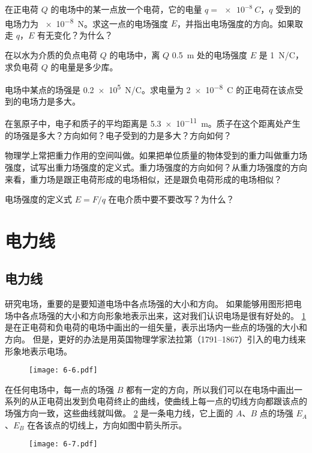 \begin{Practice}
\begin{question}
	\item 在正电荷 $Q$ 的电场中的某一点放一个电荷，它的电量 $q=\qty{e-8}{C}$，$q$ 受到的电场力为 \qty{e-8}{N}。求这一点的电场强度 $E$，并指出电场强度的方向。如果取走 $q$，$E$ 有无变化？为什么？
	\item 在以水为介质的负点电荷 $Q$ 的电场中，离 $Q$ \qty{0.5}{m} 处的电场强度 $E$ 是 \qty{1}{N/C}，求负电荷 $Q$ 的电量是多少库。
	\item 电场中某点的场强是 \qty{0.2e5}{N/C}。求电量为 \qty{2e-8}{C} 的正电荷在该点受到的电场力是多大。
	\item 在氢原子中，电子和质子的平均距离是 \qty{5.3e-11}{m}。质子在这个距离处产生的场强是多大？方向如何？电子受到的力是多大？方向如何？
	\item 物理学上常把重力作用的空间叫做。如果把单位质量的物体受到的重力叫做重力场强度，试写出重力场强度的定义式。重力场强度的方向如何？从重力场强度的方向来看，重力场是跟正电荷形成的电场相似，还是跟负电荷形成的电场相似？
	\item 电场强度的定义式 $E=F/q$ 在电介质中要不要改写？为什么？
\end{question}
\end{Practice}

\section{电力线}
\subsection{电力线}

研究电场，重要的是要知道电场中各点场强的大小和方向。
如果能够用图形把电场中各点场强的大小和方向形象地表示出来，这对我们认识电场是很有好处的。
\cref{fig:6-6} 是在正电荷和负电荷的电场中画出的一组矢量，表示出场内一些点的场强的大小和方向。
但是，更好的办法是用英国物理学家法拉第（1791--1867）引入的电力线来形象地表示电场。
\begin{figure}
	\texttt{[image: 6-6.pdf]}
	\caption{}\label{fig:6-6}
\end{figure}

在任何电场中，每一点的场强 $B$ 都有一定的方向，所以我们可以在电场中画出一系列的从正电荷出发到负电荷终止的曲线，使曲线上每一点的切线方向都跟该点的场强方向一致，这些曲线就叫做。
\cref{fig:6-7} 是一条电力线，它上面的 $A$、$B$ 点的场强 $E_A$、$E_B$ 在各该点的切线上，方向如图中箭头所示。
\begin{figure}
	\texttt{[image: 6-7.pdf]}
	\caption{}\label{fig:6-7}
\end{figure}

